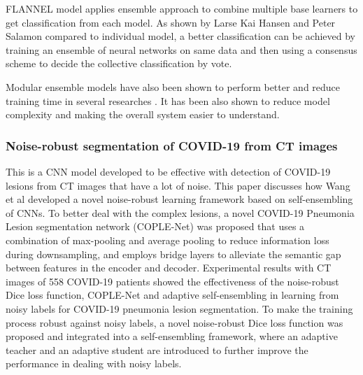 \documentclass{sigkddExp}
\begin{document}
FLANNEL model applies ensemble approach to combine multiple base learners to get
classification from each model. As shown by Larse Kai Hansen and Peter Salamon
\cite{58871} compared to individual model, a better classification can be achieved
by training an ensemble of neural networks on same data and then using a
consensus scheme to decide the collective classification by vote.

Modular ensemble models have also been shown to perform better and reduce
training time in several researches \cite{combine}. It has been also shown to
reduce model complexity and making the overall system easier to understand.


\subsubsection{Noise-robust segmentation of COVID-19 from CT images}

This is a CNN model \cite{wang2020covidnet} developed to be effective with
detection of COVID-19 lesions from CT images that have a lot of noise. This
paper discusses how Wang et al developed a novel noise-robust learning framework
based on self-ensembling of CNNs.  To better deal with the complex lesions, a
novel COVID-19 Pneumonia Lesion segmentation network (COPLE-Net) was proposed
that uses a combination of max-pooling and average pooling to reduce information
loss during downsampling, and employs bridge layers to alleviate the semantic
gap between features in the encoder and decoder. Experimental results with CT
images of 558 COVID-19 patients showed the effectiveness of the noise-robust
Dice loss function, COPLE-Net and adaptive self-ensembling in learning from
noisy labels for COVID-19 pneumonia lesion segmentation. To make the training
process robust against noisy labels, a novel noise-robust Dice loss function was
proposed and integrated into a self-ensembling framework, where an adaptive
teacher and an adaptive student are introduced to further improve the
performance in dealing with noisy labels.
\end{document}
